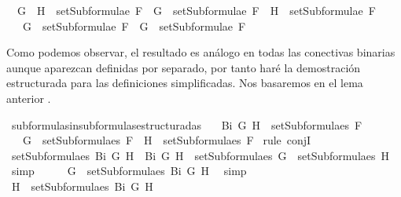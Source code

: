 \begin{isabellebody}
\ \ {\isachardoublequoteopen}G\ \isactrlbold {\isasymrightarrow}\ H\ {\isasymin}\ setSubformulae\ F\ {\isasymLongrightarrow}\ G\ {\isasymin}\ setSubformulae\ F\ {\isasymand}\ H\ {\isasymin}\ setSubformulae\ F{\isachardoublequoteclose}\isanewline
\ \ {\isachardoublequoteopen}\isactrlbold {\isasymnot}\ G\ {\isasymin}\ setSubformulae\ F\ {\isasymLongrightarrow}\ G\ {\isasymin}\ setSubformulae\ F{\isachardoublequoteclose}\isanewline
%
\isadelimproof
\ \ %
\endisadelimproof
%
\isatagproof
{}\isamarkupfalse%
%
\endisatagproof
{\isafoldproof}%
%
\isadelimproof
%
\endisadelimproof
%
\begin{isamarkuptext}%
Como podemos observar, el resultado es análogo en todas las conectivas binarias aunque
aparezcan definidas por separado, por tanto haré la demostración estructurada para
las definiciones simplificadas. Nos basaremos en el lema anterior .%
\end{isamarkuptext}\isamarkuptrue%
\isamarkupfalse%
\ subformulas{\isacharunderscore}in{\isacharunderscore}subformulas{\isacharunderscore}estructurada{}{\isacharunderscore}s{\isacharcolon}\isanewline
\ \ \ {\isachardoublequoteopen}Bi\ G\ H\ {\isasymin}\ setSubformulae{\isacharunderscore}s\ F{\isachardoublequoteclose}\ \isanewline
\ \ \ {\isachardoublequoteopen}G\ {\isasymin}\ setSubformulae{\isacharunderscore}s\ F\ {\isasymand}\ H\ {\isasymin}\ setSubformulae{\isacharunderscore}s\ F{\isachardoublequoteclose}\isanewline
%
\isadelimproof
%
\endisadelimproof
%
\isatagproof
{}\isamarkupfalse%
\ {\isacharparenleft}rule\ conjI{\isacharparenright}\isanewline
\ \ \isamarkupfalse%
\ {}{\isacharcolon}{\isachardoublequoteopen}setSubformulae{\isacharunderscore}s\ {\isacharparenleft}Bi\ G\ H{\isacharparenright}\ {\isacharequal}\ {\isacharbraceleft}Bi\ G\ H{\isacharbraceright}\ {\isasymunion}\ setSubformulae{\isacharunderscore}s\ G\ {\isasymunion}\ setSubformulae{\isacharunderscore}s\ H{\isachardoublequoteclose}\ \isamarkupfalse%
\ simp\isanewline
\ \ \isamarkupfalse%
\ \isamarkupfalse%
\ {}{\isacharcolon}{\isachardoublequoteopen}G\ {\isasymin}\ setSubformulae{\isacharunderscore}s\ {\isacharparenleft}Bi\ G\ H{\isacharparenright}{\isachardoublequoteclose}\ \isamarkupfalse%
\ simp\isanewline
\ \ \isamarkupfalse%
\ {}{\isacharcolon}{\isachardoublequoteopen}H\ {\isasymin}\ setSubformulae{\isacharunderscore}s\ {\isacharparenleft}Bi\ G\ H{\isacharparenright}{\isachardoublequoteclose}\ \isamarkupfalse%

\end{isabellebody}
